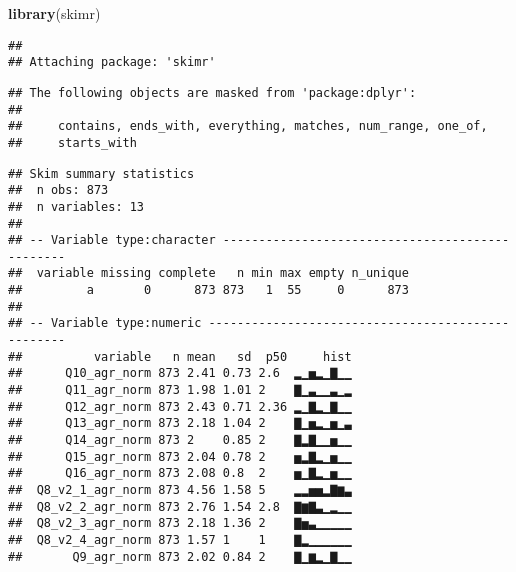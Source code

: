 \documentclass[]{article}
\newenvironment{Shaded}{\begin{snugshade}}{\end{snugshade}}
\newcommand{\KeywordTok}[1]{\textcolor[rgb]{0.13,0.29,0.53}{\textbf{{#1}}}}
\newcommand{\DataTypeTok}[1]{\textcolor[rgb]{0.13,0.29,0.53}{{#1}}}
\newcommand{\DecValTok}[1]{\textcolor[rgb]{0.00,0.00,0.81}{{#1}}}
\newcommand{\StringTok}[1]{\textcolor[rgb]{0.31,0.60,0.02}{{#1}}}
\newcommand{\CommentTok}[1]{\textcolor[rgb]{0.56,0.35,0.01}{\textit{{#1}}}}
\newcommand{\OtherTok}[1]{\textcolor[rgb]{0.56,0.35,0.01}{{#1}}}
\newcommand{\NormalTok}[1]{{#1}}
\begin{document}
\begin{Shaded}
\begin{Highlighting}[]
\KeywordTok{library}\NormalTok{(skimr)}
\end{Highlighting}
\end{Shaded}

\begin{verbatim}
## 
## Attaching package: 'skimr'
\end{verbatim}

\begin{verbatim}
## The following objects are masked from 'package:dplyr':
## 
##     contains, ends_with, everything, matches, num_range, one_of,
##     starts_with
\end{verbatim}

\begin{Shaded}
\end{Shaded}

\begin{verbatim}
## Skim summary statistics
##  n obs: 873 
##  n variables: 13 
## 
## -- Variable type:character ------------------------------------------------
##  variable missing complete   n min max empty n_unique
##         a       0      873 873   1  55     0      873
## 
## -- Variable type:numeric --------------------------------------------------
##          variable   n mean   sd  p50     hist
##      Q10_agr_norm 873 2.41 0.73 2.6  ▂▁▅▂▁▇▁▁
##      Q11_agr_norm 873 1.98 1.01 2    ▇▁▃▁▁▃▁▂
##      Q12_agr_norm 873 2.43 0.71 2.36 ▂▁▇▂▁▇▁▁
##      Q13_agr_norm 873 2.18 1.04 2    ▇▁▅▂▁▅▁▃
##      Q14_agr_norm 873 2    0.85 2    ▇▂▇▁▁▅▁▁
##      Q15_agr_norm 873 2.04 0.78 2    ▅▂▇▂▁▅▁▁
##      Q16_agr_norm 873 2.08 0.8  2    ▅▁▇▂▁▅▁▁
##  Q8_v2_1_agr_norm 873 4.56 1.58 5    ▂▂▅▅▂▇▆▃
##  Q8_v2_2_agr_norm 873 2.76 1.54 2.8  ▇▆▇▃▁▂▁▁
##  Q8_v2_3_agr_norm 873 2.18 1.36 2    ▇▅▃▁▁▁▁▁
##  Q8_v2_4_agr_norm 873 1.57 1    1    ▇▂▁▁▁▁▁▁
##       Q9_agr_norm 873 2.02 0.84 2    ▇▁▆▂▁▇▁▁
\end{verbatim}
\end{document}

